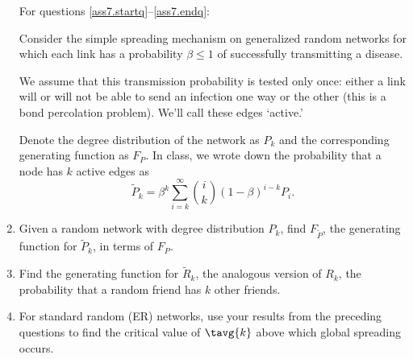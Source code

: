 \begin{enumerate}

   \solutionend
  



  \renewcommand{\fboxrule}{1pt}
  \renewcommand{\fboxsep}{0pt}
    For questions \ref{ass7.startq}--\ref{ass7.endq}:

    Consider the simple spreading mechanism on
    generalized random networks 
    for which each link has a probability  $\beta \le 1$
    of successfully transmitting a disease.

    We assume that this transmission probability is tested
    only once: either a link will or will not be
    able to send an infection one way or the other
    (this is a bond percolation problem).
    We'll call these edges `active.'

    Denote the degree distribution of the network as $P_{k}$
    and the corresponding generating function as $F_{P}$.
    In class, we wrote down the probability that
    a node has $k$ active edges as
    $$
    \tilde{P}_{k}
    =
    \beta^{k}
    \sum_{i=k}^{\infty}
    \binom{i}{k}
    (1-\beta)^{i-k}
    P_{i}.
    $$



\item 
  \label{ass7.startq}


  Given a random network with degree distribution $P_{k}$,
  find $F_{\tilde{P}}$, the generating function for $\tilde{P}_{k}$, 
  in terms of $F_{P}$.

  
   \solutionstart


   \solutionend

\item
  Find the generating function for $\tilde{R}_{k}$,
  the analogous version of $R_{k}$, the probability
  that a random friend has $k$ other friends.

  
   \solutionstart


   \solutionend


\item 
  For standard random (ER) networks,
  use your results from the preceding questions to 
  find the critical value of 
  $\tavg{k}$ above which global spreading occurs.

  
   \solutionstart


   \solutionend


\end{enumerate}
